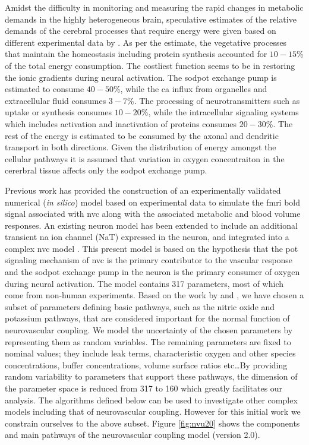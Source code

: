 Amidst the difficulty in monitoring and measuring the rapid changes in metabolic demands in the highly heterogeneous brain, speculative estimates of the relative demands of the cerebral processes that require energy were given based on different experimental data by \citet{Ames2000}. As per the estimate, the vegetative processes that maintain the homeostasis including protein synthesis accounted for $10-15$\% of the total energy consumption. The costliest function seems to be in  restoring the ionic gradients during neural activation. The \gls{sodpot} exchange pump is estimated to consume $40-50$\%, while the \gls{ca} influx from organelles and extracellular fluid consumes $3-7$\%. The processing of neurotransmitters such as uptake or synthesis consumes $10-20$\%, while the intracellular signaling systems which includes activation and inactivation of proteins consumes $20-30$\%. The rest of the energy is estimated to be consumed by the axonal and dendritic transport in both directions. Given the distribution of energy amongst the cellular pathways it is assumed that variation in oxygen concentraiton in the cererbral tissue affects only the \gls{sodpot} exchange pump. 

Previous work \cite{Mathias2018} has provided  the construction of an experimentally validated numerical (\textit{in silico}) model based on experimental data to simulate the \gls{fmri} \gls{bold} signal associated with \gls{nvc} along with the associated metabolic and blood volume responses. An existing neuron model \citep{Mathias2017, Mathias2017a} has been extended to include an additional transient \gls{na} ion channel (NaT) expressed in the neuron, and integrated into a complex \gls{nvc} model \citep{Dormanns2015, Dormanns2016b, Kenny2017a}. This present model is based on the hypothesis that the \gls{pot} signaling mechanism of \gls{nvc} is the primary contributor to the vascular response and the \gls{sodpot} exchange pump in the neuron is the primary consumer of oxygen during neural activation. The model contains 317 parameters, most of which come from non-human experiments. Based on the work by \cite{Dormanns2016b} and \cite{Kenny2018}, we have chosen a subset of parameters defining basic pathways, such as  the nitric oxide and potassium pathways,   that are considered important for the normal function of neurovascular coupling.  We model the uncertainty of the chosen parameters  by representing them as random variables. The remaining  parameters are fixed to nominal values; they include leak terms, characteristic oxygen and other species concentrations, buffer concentrations, volume surface ratios etc\dots By providing random variability to parameters that support these pathways, the dimension of the parameter space is reduced from 317 to 160 which greatly facilitates our analysis. The algorithms defined below can be used to investigate other complex models including that of neurovascular coupling. However for this initial work we constrain ourselves to the above subset. 
Figure \ref{fig:nvu20} shows the components and main pathways of the neurovascular coupling model (version 2.0). \\


